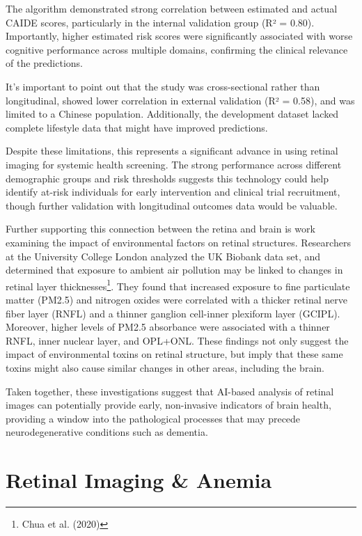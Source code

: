 \documentclass[
  Letterpaper,
]{scrbook}
\begin{document}
The algorithm demonstrated strong correlation between estimated and
actual CAIDE scores, particularly in the internal validation group (R² =
0.80). Importantly, higher estimated risk scores were significantly
associated with worse cognitive performance across multiple domains,
confirming the clinical relevance of the predictions.

It's important to point out that the study was cross-sectional rather
than longitudinal, showed lower correlation in external validation (R² =
0.58), and was limited to a Chinese population. Additionally, the
development dataset lacked complete lifestyle data that might have
improved predictions.

Despite these limitations, this represents a significant advance in
using retinal imaging for systemic health screening. The strong
performance across different demographic groups and risk thresholds
suggests this technology could help identify at-risk individuals for
early intervention and clinical trial recruitment, though further
validation with longitudinal outcomes data would be valuable.

Further supporting this connection between the retina and brain is work
examining the impact of environmental factors on retinal structures.
Researchers at the University College London analyzed the UK Biobank
data set, and determined that exposure to ambient air pollution may be
linked to changes in retinal layer thicknesses\footnote{Chua et al.
  (2020)}. They found that increased exposure to fine particulate matter
(PM2.5) and nitrogen oxides were correlated with a thicker retinal nerve
fiber layer (RNFL) and a thinner ganglion cell-inner plexiform layer
(GCIPL). Moreover, higher levels of PM2.5 absorbance were associated
with a thinner RNFL, inner nuclear layer, and OPL+ONL. These findings
not only suggest the impact of environmental toxins on retinal
structure, but imply that these same toxins might also cause similar
changes in other areas, including the brain.

Taken together, these investigations suggest that AI-based analysis of
retinal images can potentially provide early, non-invasive indicators of
brain health, providing a window into the pathological processes that
may precede neurodegenerative conditions such as dementia.

\section{Retinal Imaging \& Anemia}\label{retinal-imaging-anemia}
\end{document}

